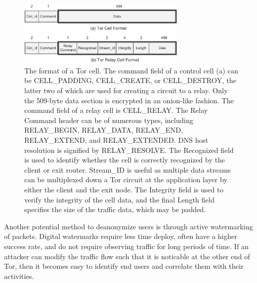 \documentclass[journal]{IEEEtran}
\begin{document}
\begin{figure}[htbp]
\centering
\begin{minipage}{8 cm}
    \includegraphics[width=80mm]{resources/tor-cell-format.png}
    \caption{The format of a Tor cell. The command field of a control cell (a) can be CELL\_PADDING, CELL\_CREATE, or CELL\_DESTROY, the latter two of which are used for creating a circuit to a relay. Only the 509-byte data section is encrypted in an onion-like fashion. \newline\hspace*{2em} The command field of a relay cell is CELL\_RELAY. The Relay Command header can be of numerous types, including RELAY\_BEGIN, RELAY\_DATA, RELAY\_END, RELAY\_EXTEND, and RELAY\_EXTENDED. DNS host resolution is signified by RELAY\_RESOLVE. The Recognized field is used to identify whether the cell is correctly recognized by the client or exit router. Stream\_ID is useful as multiple data streams can be multiplexed down a Tor circuit at the application layer by either the client and the exit node. The Integrity field is used to verify the integrity of the cell data, and the final Length field specifies the size of the traffic data, which may be padded.}
\end{minipage}
\end{figure}

Another potential method to deanonymize users is through active watermarking of packets. Digital watermarks require less time deploy, often have a higher success rate, and do not require observing traffic for long periods of time. If an attacker can modify the traffic flow such that it is noticable at the other end of Tor, then it becomes easy to identify end users and correlate them with their activities.
\end{document}
